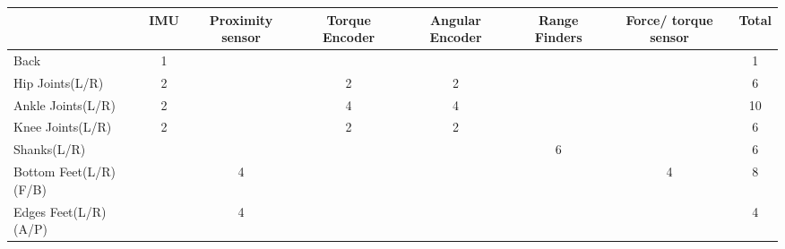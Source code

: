 \begin{table}[]
	\centering
	\begin{tabular}{|l|c|c|c|c|c|c|c|}
		\hline
		& \multicolumn{1}{l|}{IMU} & \multicolumn{1}{p{15mm}|}{Proximity sensor} & \multicolumn{1}{p{15mm}|}{Torque Encoder} & \multicolumn{1}{p{15mm}|}{Angular Encoder} & \multicolumn{1}{p{15mm}|}{Range Finders} & \multicolumn{1}{p{15mm}|}{Force/ torque sensor} & \multicolumn{1}{l|}{Total} \\ \hline
		Back                  & 1                        &                                       &                                     &                                      &                                    &                                          & 1                          \\ \hline
		Hip Joints(L/R)       & 2                        &                                       & 2                                   & 2                                    &                                    &                                          & 6                          \\ \hline
		Ankle Joints(L/R)     & 2                        &                                       & 4                                   & 4                                    &                                    &                                          & 10                         \\ \hline
		Knee Joints(L/R)      & 2                        &                                       & 2                                   & 2                                    &                                    &                                          & 6                          \\ \hline
		Shanks(L/R)           &                          &                                       &                                     &                                      & 6                                  &                                          & 6                          \\ \hline
		Bottom Feet(L/R)(F/B) &                          & 4                                     &                                     &                                      &                                    & 4                                        & 8                          \\ \hline
		Edges Feet(L/R)(A/P)  &                          & 4                                     &                                     &                                      &                                    &                                          & 4                          \\ \hline

\end{tabular}
\end{table}
